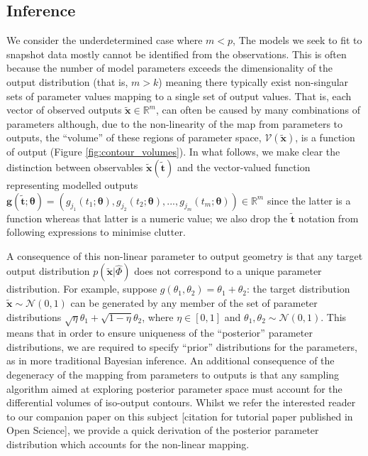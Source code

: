 \subsection{Inference}

We consider the underdetermined case where $m<p$,
The models we seek to fit to snapshot data mostly cannot be identified from the observations. This is often because the number of model parameters exceeds the dimensionality of the output distribution (that is, $m>k$) meaning there typically exist non-singular sets of parameter values mapping to a single set of output values. That is, each vector of observed outputs $\tilde{\boldsymbol{x}}\in\mathbb{R}^m$, can often be caused by many combinations of parameters although, due to the non-linearity of the map from parameters to outputs, the ``volume'' of these regions of parameter space, $\mathcal{V}(\tilde{\boldsymbol{x}})$, is a function of output (Figure \ref{fig:contour_volumes}). In what follows, we make clear the distinction between observables $\tilde{\boldsymbol{x}}(\tilde{\boldsymbol{t}})$ and the vector-valued function representing modelled outputs $\boldsymbol{g}(\tilde{\boldsymbol{t}}; \boldsymbol{\theta})=(g_{j_1}(t_1; \boldsymbol{\theta}),g_{j_2}(t_2; \boldsymbol{\theta}),...,g_{j_m}(t_m; \boldsymbol{\theta}))\in\mathbb{R}^m$ since the latter is a function whereas that latter is a numeric value; we also drop the $\tilde{\boldsymbol{t}}$ notation from following expressions to minimise clutter.

A consequence of this non-linear parameter to output geometry is that any target output distribution $p(\tilde{\boldsymbol{x}}|\hat{\Phi})$ does not correspond to a unique parameter distribution. For example, suppose $g(\theta_1, \theta_2) = \theta_1 + \theta_2$: the target distribution $\tilde{\boldsymbol{x}}\sim \mathcal{N}(0, 1)$ can be generated by any member of the set of parameter distributions $\sqrt{\eta} \theta_1 + \sqrt{1 - \eta} \theta_2$, where $\eta\in [0, 1]$ and $\theta_1, \theta_2 \sim \mathcal{N}(0, 1)$. This means that in order to ensure uniqueness of the ``posterior'' parameter distributions, we are required to specify ``prior'' distributions for the parameters, as in more traditional Bayesian inference. An additional consequence of the degeneracy of the mapping from parameters to outputs is that any sampling algorithm aimed at exploring posterior parameter space must account for the differential volumes of iso-output contours. Whilst we refer the interested reader to our companion paper on this subject [citation for tutorial paper published in Open Science], we provide a quick derivation of the posterior parameter distribution which accounts for the non-linear mapping.

